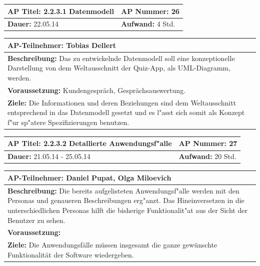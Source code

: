 \documentclass[fontsize=12pt,paper=a4,twoside]{scrartcl}
\begin{document}
\begin{tabular}{|p{7.43cm}|p{7.43cm}|}
\hline
\textbf{AP Titel: }2.2.3.1 Datenmodell & \textbf{AP Nummer: }26\\ 
\hline
\textbf{Dauer: }22.05.14 & \textbf{Aufwand: } 4 Std.\\
\hline
\end{tabular}
\begin{tabular}{|p{15.3cm}|}
\hline
\textbf{AP-Teilnehmer: }Tobias Dellert\\
\hline
\textbf{Beschreibung: }Das zu entwickelnde Datenmodell soll eine konzeptionelle Darstellung von dem Weltausschnitt der Quiz-App, als UML-Diagramm, werden.
\\
\hline
\textbf{Voraussetzung: }Kundengespräch, Gesprächsauswertung.\\
\hline 
\textbf{Ziele: }Die Informationen und deren Beziehungen sind dem Weltausschnitt entsprechend in das Datenmodell gesetzt und es l"asst sich somit als Konzept f"ur sp"atere Spezifizierungen benutzen.\\
\hline 
\end{tabular}

\begin{tabular}{|p{7.43cm}|p{7.43cm}|}
\hline
\textbf{AP Titel: }2.2.3.2 Detallierte Anwendungsf"alle & \textbf{AP Nummer: }27\\ 
\hline
\textbf{Dauer: }21.05.14 - 25.05.14 & \textbf{Aufwand: } 20 Std.\\
\hline
\end{tabular}
\begin{tabular}{|p{15.3cm}|}
\hline
\textbf{AP-Teilnehmer: }Daniel Pupat, Olga Miloevich\\
\hline
\textbf{Beschreibung: }Die bereits aufgelisteten Anwendungsf"alle werden mit den Personas und genaueren Beschreibungen erg"anzt. Das Hineinversetzen in die unterschiedlichen Personas hilft die bisherige Funktionalit"at aus der Sicht der Benutzer zu sehen.\\
\hline
\textbf{Voraussetzung: }\\
\hline 
\textbf{Ziele: }Die Anwendungsfälle müssen insgesamt die ganze gewünschte Funktionalität der Software wiedergeben.\\
\hline 
\end{tabular}
\end{document}
